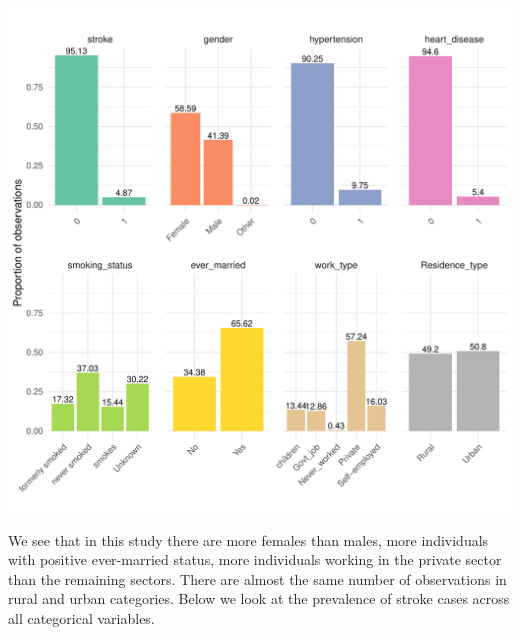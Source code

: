 \documentclass[
]{article}
\begin{document}
\includegraphics{Build-deploy-stroke-prediction-model-R_files/figure-latex/cat-plot-1.pdf}

We see that in this study there are more females than males, more
individuals with positive ever-married status, more individuals working
in the private sector than the remaining sectors. There are almost the
same number of observations in rural and urban categories. Below we look
at the prevalence of stroke cases across all categorical variables.
\end{document}
